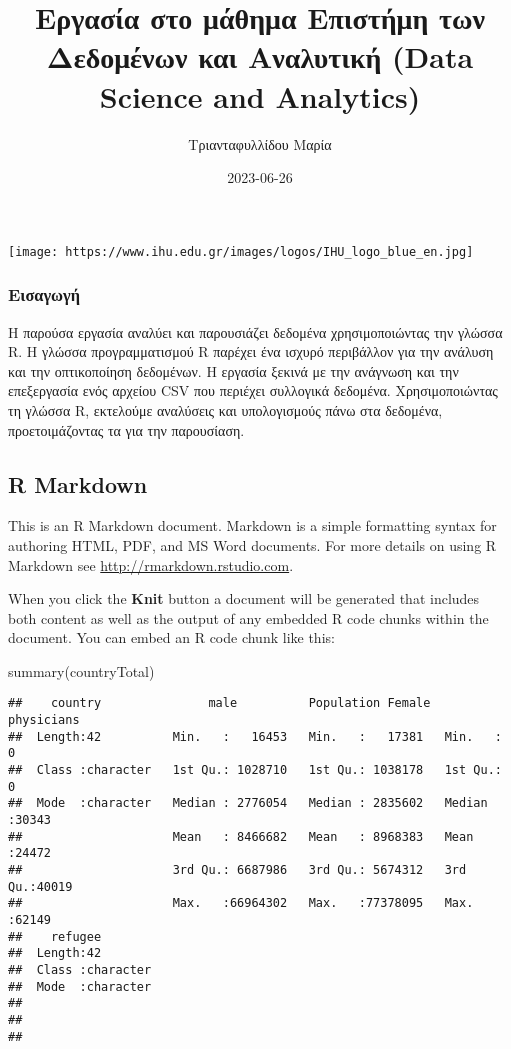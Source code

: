 \documentclass[
]{article}
\title{Εργασία στο μάθημα Επιστήμη των Δεδομένων και Αναλυτική (Data
Science and Analytics)}
\author{Τριανταφυλλίδου Μαρία}
\date{2023-06-26}
\newenvironment{Shaded}{\begin{snugshade}}{\end{snugshade}}
\newcommand{\FunctionTok}[1]{\textcolor[rgb]{0.00,0.00,0.00}{#1}}
\newcommand{\NormalTok}[1]{#1}
\begin{document}
\maketitle

\texttt{[image: https://www.ihu.edu.gr/images/logos/IHU\_logo\_blue\_en.jpg]}

\hypertarget{ux3b5ux3b9ux3c3ux3b1ux3b3ux3c9ux3b3ux3ae}{%
\subsubsection{Εισαγωγή}\label{ux3b5ux3b9ux3c3ux3b1ux3b3ux3c9ux3b3ux3ae}}

Η παρούσα εργασία αναλύει και παρουσιάζει δεδομένα χρησιμοποιώντας την
γλώσσα R. Η γλώσσα προγραμματισμού R παρέχει ένα ισχυρό περιβάλλον για
την ανάλυση και την οπτικοποίηση δεδομένων. Η εργασία ξεκινά με την
ανάγνωση και την επεξεργασία ενός αρχείου CSV που περιέχει συλλογικά
δεδομένα. Χρησιμοποιώντας τη γλώσσα R, εκτελούμε αναλύσεις και
υπολογισμούς πάνω στα δεδομένα, προετοιμάζοντας τα για την παρουσίαση.

\hypertarget{r-markdown}{%
\subsection{R Markdown}\label{r-markdown}}

This is an R Markdown document. Markdown is a simple formatting syntax
for authoring HTML, PDF, and MS Word documents. For more details on
using R Markdown see \url{http://rmarkdown.rstudio.com}.

When you click the \textbf{Knit} button a document will be generated
that includes both content as well as the output of any embedded R code
chunks within the document. You can embed an R code chunk like this:

\begin{Shaded}
\begin{Highlighting}[]
\FunctionTok{summary}\NormalTok{(countryTotal)}
\end{Highlighting}
\end{Shaded}

\begin{verbatim}
##    country               male          Population Female    physicians   
##  Length:42          Min.   :   16453   Min.   :   17381   Min.   :    0  
##  Class :character   1st Qu.: 1028710   1st Qu.: 1038178   1st Qu.:    0  
##  Mode  :character   Median : 2776054   Median : 2835602   Median :30343  
##                     Mean   : 8466682   Mean   : 8968383   Mean   :24472  
##                     3rd Qu.: 6687986   3rd Qu.: 5674312   3rd Qu.:40019  
##                     Max.   :66964302   Max.   :77378095   Max.   :62149  
##    refugee         
##  Length:42         
##  Class :character  
##  Mode  :character  
##                    
##                    
## 
\end{verbatim}
\end{document}
